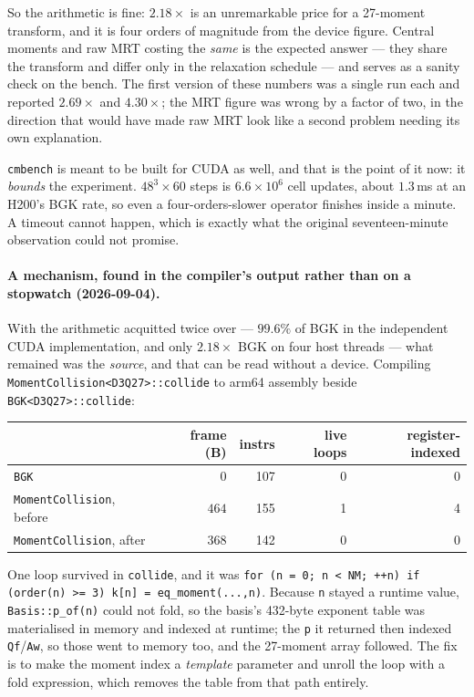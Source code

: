 \documentclass[11pt,a4paper]{article}
\newcommand{\code}[1]{\texttt{\small #1}}
\newcommand{\e}[1]{\times 10^{#1}}
\begin{document}
\noindent So the arithmetic is fine: $2.18\times$ is an unremarkable price for a
27-moment transform, and it is four orders of magnitude from the device figure.
Central moments and raw MRT costing the \emph{same} is the expected answer --- they
share the transform and differ only in the relaxation schedule --- and serves as a
sanity check on the bench. The first version of these numbers was a single run
each and reported $2.69\times$ and $4.30\times$; the MRT figure was wrong by a
factor of two, in the direction that would have made raw MRT look like a second
problem needing its own explanation.

\code{cmbench} is meant to be built for CUDA as well, and that is the point of
it now: it \emph{bounds} the experiment. $48^3 \times 60$ steps is
$6.6\e{6}$ cell updates, about $1.3$\,ms at an H200's BGK rate, so even a
four-orders-slower operator finishes inside a minute. A timeout cannot happen,
which is exactly what the original seventeen-minute observation could not
promise.

\paragraph{A mechanism, found in the compiler's output rather than on a
stopwatch (2026-09-04).} With the arithmetic acquitted twice over --- $99.6\%$
of BGK in the independent CUDA implementation, and only $2.18\times$ BGK on four
host threads --- what remained was the \emph{source}, and
that can be read without a device. Compiling
\code{MomentCollision<D3Q27>::collide} to arm64 assembly beside
\code{BGK<D3Q27>::collide}:

\begin{center}\small
\begin{tabular}{lrrrr}
\toprule
 & frame (B) & instrs & live loops & register-indexed \\
\midrule
\code{BGK} & $0$ & 107 & 0 & 0 \\
\code{MomentCollision}, before & $464$ & 155 & 1 & 4 \\
\code{MomentCollision}, after  & $368$ & 142 & 0 & 0 \\
\bottomrule
\end{tabular}
\end{center}

\noindent One loop survived in \code{collide}, and it was
\code{for (n = 0; n < NM; ++n) if (order(n) >= 3) k[n] = eq\_moment(...,n)}.
Because \code{n} stayed a runtime value, \code{Basis::p\_of(n)} could not fold,
so the basis's 432-byte exponent table was materialised in memory and indexed at
runtime; the \code{p} it returned then indexed \code{Qf}/\code{Aw}, so those
went to memory too, and the 27-moment array followed. The fix is to make the
moment index a \emph{template} parameter and unroll the loop with a fold
expression, which removes the table from that path entirely.
\end{document}
